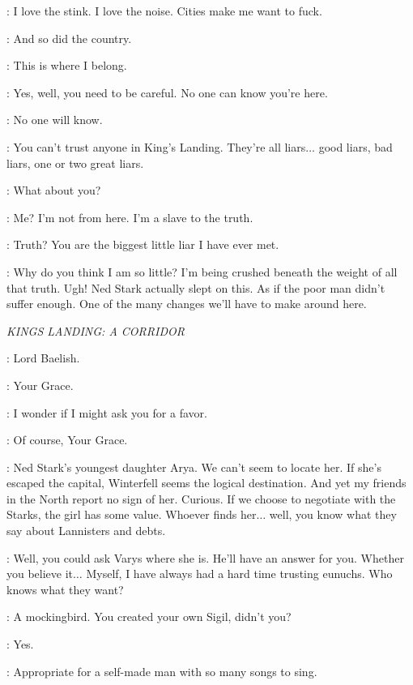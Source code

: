 \SHAE: I love the stink. I love the noise. Cities make me want to fuck.

\TYRION: And so did the country.

\SHAE: This is where I belong.

\TYRION: Yes, well, you need to be careful. No one can know you're here.

\SHAE: No one will know.

\TYRION: You can't trust anyone in King's Landing. They're all liars$\ldots$ good liars, bad liars, one or two great liars.

\SHAE: What about you?

\TYRION: Me? I'm not from here. I'm a slave to the truth.

\SHAE: Truth? You are the biggest little liar I have ever met.

\TYRION: Why do you think I am so little? I'm being crushed beneath the weight of all that truth.  Ugh! Ned Stark actually slept on this. As if the poor man didn't suffer enough. One of the many changes we'll have to make around here.


\scene

\textit{KINGS LANDING: A CORRIDOR}


\CERSEI: Lord Baelish.

\LITTLEFINGER: Your Grace.

\CERSEI: I wonder if I might ask you for a favor.

\LITTLEFINGER: Of course, Your Grace.

\CERSEI: Ned Stark's youngest daughter Arya. We can't seem to locate her. If she's escaped the capital, Winterfell seems the logical destination. And yet my friends in the North report no sign of her. Curious. If we choose to negotiate with the Starks, the girl has some value. Whoever finds her$\ldots$ well, you know what they say about Lannisters and debts.

\LITTLEFINGER: Well, you could ask Varys where she is. He'll have an answer for you. Whether you believe it$\ldots$ Myself, I have always had a hard time trusting eunuchs. Who knows what they want?

\CERSEI: A mockingbird. You created your own Sigil, didn't you?

\LITTLEFINGER: Yes.

\CERSEI: Appropriate for a self-made man with so many songs to sing.

